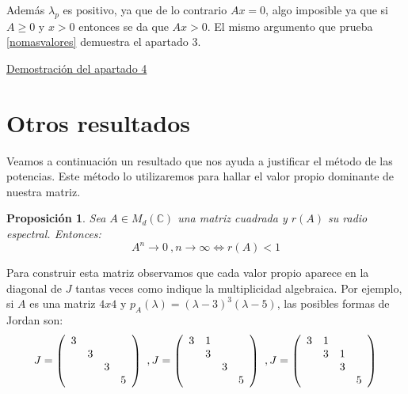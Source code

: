 \documentclass[size=a4, parskip=half, titlepage=false, toc=flat, toc=bib, 12pt]{scrartcl}
\makeatletter
\renewenvironment{proof}[1][\proofname] {\par\pushQED{\qed}\normalfont\topsep6\p@\@plus6\p@\relax\trivlist\item[\hskip\labelsep\itshape\tgpaella#1\@addpunct{.}]\ignorespaces}{\popQED\endtrivlist\@endpefalse}
\theoremstyle{theorem-style}
\newtheorem{nprop}{Proposición}[section]
\theoremstyle{definition-style}
\theoremstyle{remark-style}
\theoremstyle{example-style}
\theoremstyle{definition-style}
\theoremstyle{remark-style}
\makeatother
\begin{document}
\begin{proof}
Además $\lambda_p$ es positivo, ya que de lo contrario $Ax = 0$, algo imposible ya que si $A \geq 0$ y $x > 0$ entonces se da que $Ax > 0$. El mismo argumento que prueba \ref{nomasvalores}
demuestra el apartado 3.
\end{proof}

\underline{Demostración del apartado 4}

\newpage

\section{Otros resultados}
Veamos a continuación un resultado que nos ayuda a justificar el método de las potencias. Este método lo utilizaremos para hallar el valor propio dominante de nuestra matriz.

\begin{nprop}
\label{res1}
Sea $A \in M_d(\mathbb{C})$ una matriz cuadrada y $r(A)$ su radio espectral. Entonces:
$$A^n \rightarrow 0 \ ,  n \rightarrow \infty \Leftrightarrow r(A) < 1 $$
\end{nprop}



Para construir esta matriz observamos que cada valor propio aparece en la diagonal de $J$ tantas veces como indique la multiplicidad algebraica. Por ejemplo, si $A$ es una matriz $4x4$ y $p_A(\lambda) = (\lambda - 3)^3 (\lambda - 5)$, las posibles formas de Jordan son:
$$J = \left(
      \begin{array}{{cccc}}
        3   &           &         &     \\
              &    3    &         &     \\
              &         & 3       &     \\
              &        &         & 5
      \end{array}
\right) \ ,  J = \left(
      \begin{array}{{cccc}}
        3   &    1      &         &     \\
            &    3      &         &     \\
            &           & 3       &     \\
            &           &         & 5
      \end{array}
\right)\ , J = \left(
      \begin{array}{{cccc}}
        3     &     1     &         &     \\
              &    3      &   1     &     \\
              &           & 3       &     \\
              &           &         & 5
      \end{array}
\right) $$
\end{document}
